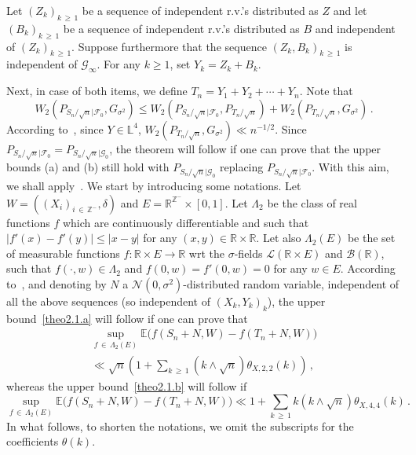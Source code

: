 \documentclass[AHL,Unicode,longabstracts,published]{cedram}
\newcommand{\bbE}{\mathbb{E}}
\newcommand{\bbZ}{\mathbb{Z}}
\newcommand{\clF}{\mathcal{F}}
\newcommand{\clN}{\mathcal{N}}
\newcommand{\clL}{\mathcal{L}}
\newcommand{\clB}{\mathcal{B}}
\newcommand{\clG}{\mathcal{G}}
\newcommand{\bbR}{\mathbb{R}}
\newcommand{\bbL}{\mathbb{L}}
\begin{document}
Let $(Z_k)_{k\,\geq\,1}$ be a sequence of independent r.v.'s distributed as $Z$ and let $(B_k)_{k\,\geq\,1}$ be a sequence of independent r.v.'s distributed as $B$ and independent of $(Z_k)_{k\,\geq\,1}$. Suppose furthermore that the sequence $(Z_k,B_k)_{k\,\geq\,1}$ is independent of $\clG_\infty$. For any $k \geq 1$, set $Y_k = Z_k+B_k$.

Next, in case of both items, we define $T_n = Y_1 + Y_2 + \cdots + Y_n$. Note that
\[
W_2 \left(P_{S_n / {\sqrt n}|\clF_0 }, G_{\sigma^2}\right) \leq W_2 \left(P_{S_n / {\sqrt n}|\clF_0 }, P_{T_n / {\sqrt n}}\right) + W_2 \left(P_{T_n / {\sqrt n}}, G_{\sigma^2}\right) \,.
\]
According to~\cite[Theorem~4.1]{Rio09}, since $Y \in \bbL^4$, $W_2 (P_{T_n / {\sqrt n}}, G_{\sigma^2}) \ll n^{-1/2}$. Since $P_{S_n / {\sqrt n}|\clF_0} = P_{S_n / {\sqrt n}|\clG_0}$, the theorem will follow if one can prove that the upper bounds (a) and (b) still hold with $P_{S_n / {\sqrt n}|\clG_0 }$ replacing $P_{S_n / {\sqrt n}|\clF_0 }$. With this aim, we shall apply~\cite[Lemma~A.1]{MR12}. We start by introducing some notations. Let $W= ((X_i)_{i\,\in\,{\bbZ}^-}, \delta)$ and $E = {\bbR}^{{\bbZ}^-} \times [0,1]$. Let $\Lambda_2$ be the class of real functions $f$ which are continuously differentiable and such that $|f'(x) - f'(y) |\leq | x - y |$ for any $(x,y) \in \bbR \times \bbR$. Let also $\Lambda_2 (E)$ be the set of measurable functions $f:\bbR
\times E \rightarrow \bbR$ wrt the $\sigma$-fields $\clL(\bbR \times E) $ and $\clB (\bbR)$, such that $f(\cdot, w) \in \Lambda_2$ and $f(0,w)=f'(0,w)=0$ for any $w \in E$. According to~\cite[Lemma~A.1]{MR12}, and denoting by $N$ a $\clN(0,\sigma^2)$-distributed random variable, independent of all the above sequences (so independent of $(X_k,Y_k)_k$), the upper bound~\eqref{theo2.1.a} will follow if one can prove that
\begin{multline}\label{W2condp2-Itema}
\sup_{f\,\in\,\Lambda_2 (E)} \bbE \big(f (S_n + N, W) - f (T_n + N, W) \big)\\
\ll \sqrt{n} \left(1 + \sum_{k\,\geq\,1} \left(k \wedge \sqrt{n}\right) \theta_{X,2,2} (k) \right) \,,
\end{multline}
whereas the upper bound~\eqref{theo2.1.b} will follow if
\begin{equation}\label{W2condp2}
\sup_{f\,\in\,\Lambda_2 (E) } \bbE \big (f (S_n + N, W) - f (T_n + N, W) \big) \ll 1 + \sum_{k\,\geq\,1} k \left(k \wedge \sqrt{n}\right) \theta_{X,4,4} (k) \,.
\end{equation}
In what follows, to shorten the notations, we omit the subscripts for the coefficients $\theta (k)$.
\end{document}
